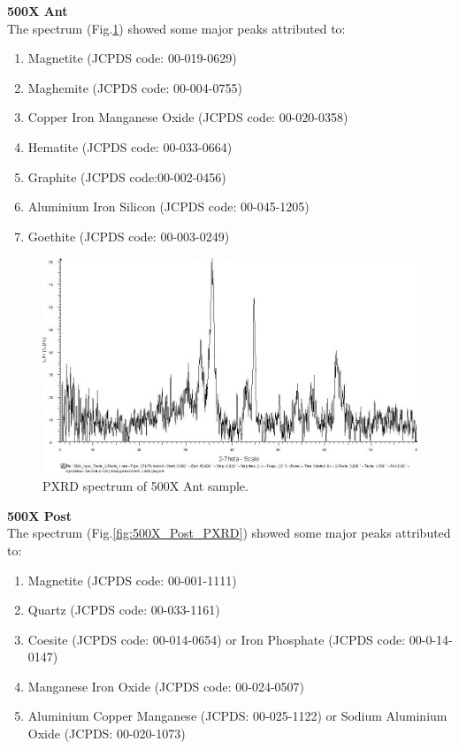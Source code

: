 \pagebreak

\textbf{500X Ant} \\
The spectrum (Fig.\ref{fig:500X_Ant_PXRD}) showed some major peaks attributed to:

\begin{enumerate}[noitemsep]
   \item Magnetite (JCPDS code: 00-019-0629)
    \item Maghemite (JCPDS code: 00-004-0755)
    \item Copper Iron Manganese Oxide (JCPDS code: 00-020-0358)
    \item Hematite (JCPDS code: 00-033-0664)
    \item Graphite (JCPDS code:00-002-0456)
    \item Aluminium Iron Silicon (JCPDS code: 00-045-1205)
    \item Goethite (JCPDS code: 00-003-0249)
\end{enumerate}

\begin{figure}[H]
\centering
    \includegraphics[scale=0.46]{images/500X_1gse_disco_ant_edit.jpg}
    \caption{PXRD spectrum of 500X Ant sample.}
    \label{fig:500X_Ant_PXRD}
\end{figure} 

\textbf{500X Post} \\
The spectrum (Fig.\ref{fig:500X_Post_PXRD}) showed some major peaks attributed to:

\begin{enumerate}[noitemsep]
    \item Magnetite (JCPDS code: 00-001-1111)
    \item Quartz (JCPDS code: 00-033-1161)
    \item Coesite (JCPDS code: 00-014-0654) or Iron Phosphate (JCPDS code: 00-0-14-0147)
    \item Manganese Iron Oxide (JCPDS code: 00-024-0507)
    \item Aluminium Copper Manganese (JCPDS: 00-025-1122) or Sodium Aluminium Oxide (JCPDS: 00-020-1073)
\end{enumerate}

